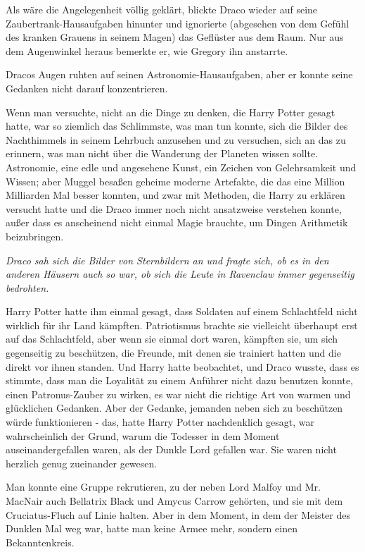 {Als wäre die Angelegenheit völlig geklärt, blickte Draco wieder auf seine Zaubertrank-Hausaufgaben hinunter und ignorierte (abgesehen von dem Gefühl des kranken Grauens in seinem Magen) das Geflüster aus dem Raum. Nur aus dem Augenwinkel heraus bemerkte er, wie Gregory ihn anstarrte.

Dracos Augen ruhten auf seinen Astronomie-Hausaufgaben, aber er konnte seine Gedanken nicht darauf konzentrieren.

Wenn man versuchte, nicht an die Dinge zu denken, die Harry Potter gesagt hatte, war so ziemlich das Schlimmste, was man tun konnte, sich die Bilder des Nachthimmels in seinem Lehrbuch anzusehen und zu versuchen, sich an das zu erinnern, was man nicht über die Wanderung der Planeten wissen sollte. Astronomie, eine edle und angesehene Kunst, ein Zeichen von Gelehrsamkeit und Wissen; aber Muggel besaßen geheime moderne Artefakte, die das eine Million Milliarden Mal besser konnten, und zwar mit Methoden, die Harry zu erklären versucht hatte und die Draco immer noch nicht ansatzweise verstehen konnte, außer dass es anscheinend nicht einmal Magie brauchte, um Dingen Arithmetik beizubringen.

\emph{Draco sah sich die Bilder von Sternbildern an und fragte sich, ob es in den anderen Häusern auch so war, ob sich die Leute in Ravenclaw immer gegenseitig bedrohten.}

Harry Potter hatte ihm einmal gesagt, dass Soldaten auf einem Schlachtfeld nicht wirklich für ihr Land kämpften. Patriotismus brachte sie vielleicht überhaupt erst auf das Schlachtfeld, aber wenn sie einmal dort waren, kämpften sie, um sich gegenseitig zu beschützen, die Freunde, mit denen sie trainiert hatten und die direkt vor ihnen standen. Und Harry hatte beobachtet, und Draco wusste, dass es stimmte, dass man die Loyalität zu einem Anführer nicht dazu benutzen konnte, einen Patronus-Zauber zu wirken, es war nicht die richtige Art von warmen und glücklichen Gedanken. Aber der Gedanke, jemanden neben sich zu beschützen würde funktionieren - das, hatte Harry Potter nachdenklich gesagt, war wahrscheinlich der Grund, warum die Todesser in dem Moment auseinandergefallen waren, als der Dunkle Lord gefallen war. Sie waren nicht herzlich genug zueinander gewesen.

Man konnte eine Gruppe rekrutieren, zu der neben Lord Malfoy und Mr. MacNair auch Bellatrix Black und Amycus Carrow gehörten, und sie mit dem Cruciatus-Fluch auf Linie halten. Aber in dem Moment, in dem der Meister des Dunklen Mal weg war, hatte man keine Armee mehr, sondern einen Bekanntenkreis.

}
